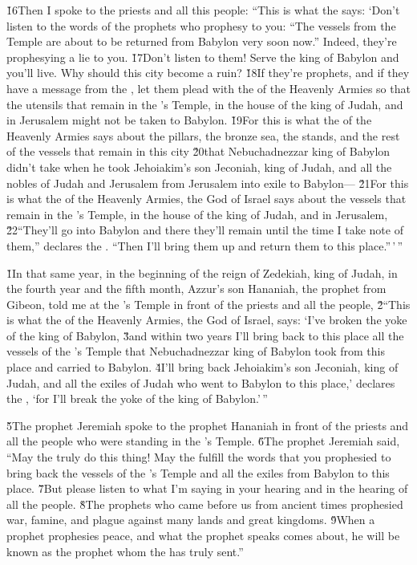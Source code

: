 \v{16}Then I spoke to the priests and all this people: ``This is what the  says: `Don't listen to the words of the prophets who prophesy to you: ``The vessels from the Temple are about to be returned from Babylon very soon now.'' Indeed, they're prophesying a lie to you. \v{17}Don't listen to them! Serve the king of Babylon and you'll live. Why should this city become a ruin? \v{18}If they're prophets, and if they have a message from the , let them plead with the  of the Heavenly Armies so that the utensils that remain in the 's Temple, in the house of the king of Judah, and in Jerusalem might not be taken to Babylon. \v{19}For this is what the  of the Heavenly Armies says about the pillars, the bronze sea, the stands, and the rest of the vessels that remain in this city \v{20}that Nebuchadnezzar king of Babylon didn't take when he took Jehoiakim's son Jeconiah, king of Judah, and all the nobles of Judah and Jerusalem from Jerusalem into exile to Babylon--- \v{21}For this is what the  of the Heavenly Armies, the God of Israel says about the vessels that remain in the 's Temple, in the house of the king of Judah, and in Jerusalem, \v{22}``They'll go into Babylon and there they'll remain until the time I take note of them,'' declares the . ``Then I'll bring them up and return them to this place.''\,'\,''

\v{1}In that same year, in the beginning of the reign of Zedekiah, king of Judah, in the fourth year and the fifth month, Azzur's son Hananiah, the prophet from Gibeon, told me at the 's Temple in front of the priests and all the people, \v{2}``This is what the  of the Heavenly Armies, the God of Israel, says: `I've broken the yoke of the king of Babylon, \v{3}and within two years I'll bring back to this place all the vessels of the 's Temple that Nebuchadnezzar king of Babylon took from this place and carried to Babylon. \v{4}I'll bring back Jehoiakim's son Jeconiah, king of Judah, and all the exiles of Judah who went to Babylon to this place,' declares the , `for I'll break the yoke of the king of Babylon.'\,''

\v{5}The prophet Jeremiah spoke to the prophet Hananiah in front of the priests and all the people who were standing in the 's Temple. \v{6}The prophet Jeremiah said, ``May the  truly do this thing! May the  fulfill the words that you prophesied to bring back the vessels of the 's Temple and all the exiles from Babylon to this place. \v{7}But please listen to what I'm saying in your hearing and in the hearing of all the people. \v{8}The prophets who came before us from ancient times prophesied war, famine, and plague against many lands and great kingdoms. \v{9}When a prophet prophesies peace, and what the prophet speaks comes about, he will be known as the prophet whom the  has truly sent.''

